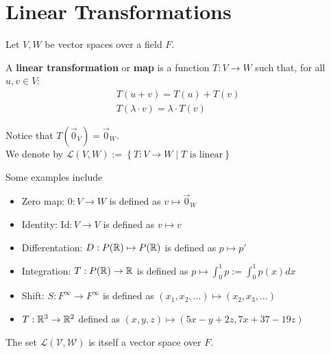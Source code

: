 \documentclass{memoir}
\begin{document}
\chapter{Linear Transformations}
Let $V, W$ be vector spaces over a field $F$.
\begin{defn}
	A \textbf{linear transformation} or \textbf{map} is a function $T:V\to W$ such that, for all $u,v \in V$:
	\begin{align*}
		T(u+v) = T(u) + T(v) \\
		T(\lambda\cdot v) = \lambda \cdot T(v)
	\end{align*}
\end{defn}
Notice that $T(\vec{0}_V) = \vec{0}_W$.\\

We denote by $\mathcal{L}(V,W) := \left\{ T: V\to W \mid T \text{ is linear} \right\} $
\begin{exmp}
	Some examples include
	\begin{itemize}
		\item Zero map: $0:V\to W$ is defined as $v \mapsto \vec{0}_W$
		\item Identity: $\text{Id}:V\to V$ is defined as $v\mapsto v$
		\item Differentation: $D:P(\mathbb{R})\mapsto P(\mathbb{R})$ is defined as $p \mapsto p'$
		\item Integration: $T:P(\mathbb{R}) \to \mathbb{R}$ is defined as $p \mapsto \int_0^1 p := \int_0^1 p(x)dx$
		\item Shift: $S:F^{\infty}\to  F^{\infty}$ is defined as $(x_1,x_2,\ldots) \mapsto (x_2,x_3,\ldots)$
		\item $T: \mathbb{R}^3 \to \mathbb{R}^2 $ defined as $(x,y,z) \mapsto (5x-y+2z, 7x+37-19z)$
	\end{itemize}
\end{exmp}
\begin{cor}
	The set $\mathcal{L(V,W)}$ is itself a vector space over $F$.
\end{cor}
\end{document}

